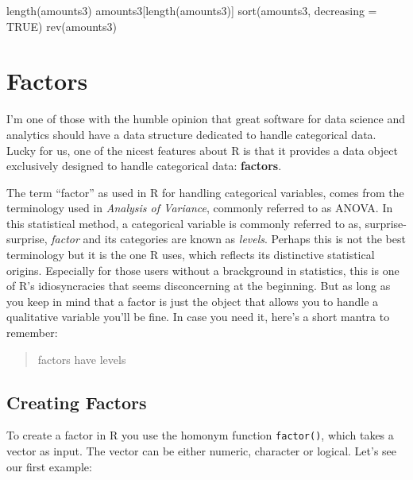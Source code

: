 \documentclass[
]{book}
\newenvironment{Shaded}{\begin{snugshade}}{\end{snugshade}}
\newcommand{\AttributeTok}[1]{\textcolor[rgb]{0.77,0.63,0.00}{#1}}
\newcommand{\ConstantTok}[1]{\textcolor[rgb]{0.00,0.00,0.00}{#1}}
\newcommand{\FunctionTok}[1]{\textcolor[rgb]{0.00,0.00,0.00}{#1}}
\newcommand{\NormalTok}[1]{#1}
\begin{document}
\begin{Shaded}
\begin{Highlighting}[]
\FunctionTok{length}\NormalTok{(amounts3)}
\NormalTok{amounts3[}\FunctionTok{length}\NormalTok{(amounts3)]}
\FunctionTok{sort}\NormalTok{(amounts3, }\AttributeTok{decreasing =} \ConstantTok{TRUE}\NormalTok{)}
\FunctionTok{rev}\NormalTok{(amounts3)}
\end{Highlighting}
\end{Shaded}

\hypertarget{factors}{%
\chapter{Factors}\label{factors}}

I'm one of those with the humble opinion that great software for data science
and analytics should have a data structure dedicated to handle categorical data.
Lucky for us, one of the nicest features about R is that it provides a data
object exclusively designed to handle categorical data: \textbf{factors}.

The term ``factor'' as used in R for handling categorical variables, comes from
the terminology used in \emph{Analysis of Variance}, commonly referred to as ANOVA.
In this statistical method, a categorical variable is commonly referred to as,
surprise-surprise, \emph{factor} and its categories are known as \emph{levels}. Perhaps
this is not the best terminology but it is the one R uses, which reflects its
distinctive statistical origins. Especially for those users without a brackground
in statistics, this is one of R's idiosyncracies that seems disconcerning at
the beginning. But as long as you keep in mind that a factor is just the object
that allows you to handle a qualitative variable you'll be fine. In case you
need it, here's a short mantra to remember:

\begin{quote}
factors have levels
\end{quote}

\hypertarget{creating-factors}{%
\section{Creating Factors}\label{creating-factors}}

To create a factor in R you use the homonym function \texttt{factor()}, which takes a
vector as input. The vector can be either numeric, character or logical. Let's
see our first example:
\end{document}
